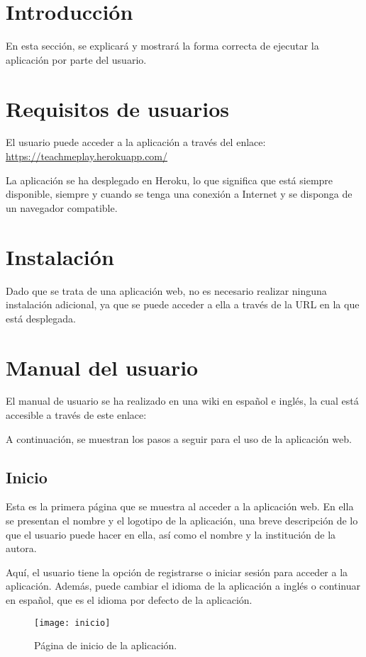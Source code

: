 
\section{Introducción}
En esta sección, se explicará y mostrará la forma correcta de ejecutar la aplicación por parte del usuario.

\section{Requisitos de usuarios}
El usuario puede acceder a la aplicación a través del enlace: \url{https://teachmeplay.herokuapp.com/}

La aplicación se ha desplegado en Heroku, lo que significa que está siempre disponible, siempre y cuando se tenga una conexión a Internet y se disponga de un navegador compatible.

\section{Instalación}
Dado que se trata de una aplicación web, no es necesario realizar ninguna instalación adicional, ya que se puede acceder a ella a través de la URL en la que está desplegada.

\section{Manual del usuario}
El manual de usuario se ha realizado en una wiki en español e inglés, la cual está
accesible a través de este enlace: 

A continuación, se muestran los pasos a seguir para el uso de la aplicación web.

\subsection{Inicio}
Esta es la primera página que se muestra al acceder a la aplicación web. En ella se presentan el nombre y el logotipo de la aplicación, una breve descripción de lo que el usuario puede hacer en ella, así como el nombre y la institución de la autora.

Aquí, el usuario tiene la opción de registrarse o iniciar sesión para acceder a la aplicación. Además, puede cambiar el idioma de la aplicación a inglés o continuar en español, que es el idioma por defecto de la aplicación.

\begin{figure}[htb]
\centering
\texttt{[image: inicio]}
\caption{Página de inicio de la aplicación.}
\label{fig:inicio}
\end{figure}

